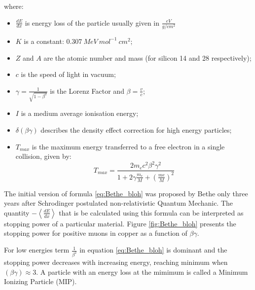 where: 
\begin{itemize}
    \item $\frac{dE}{dx}$ is energy loss of the particle usually given in $\frac{eV}{g/cm^{2}}$
    \item $K$ is a constant: $0.307~ MeV~ mol^{-1}~ cm^2$;
    \item $Z$ and $A$ are the atomic number and mass (for silicon 14 and 28 respectively);
    \item $c$ is the speed of light in vacuum;
    \item $\gamma = \frac{1}{\sqrt{1-\beta^2}}$ is the Lorenz Factor and $\beta = \frac{v}{c}$;
    \item $I$ is a medium average ionisation energy;
    \item $\delta(\beta \gamma)$ describes the density effect correction for high energy particles; 
    \item $T_{max}$ is the maximum energy transferred to a free electron in a single collision, given by:
    \begin{equation}
        T_{max} = \frac{2m_e c^2 \beta^2 \gamma^2}{1+2\gamma \frac{m_e}{M}+ (\frac{me}{M})^2}
    \end{equation}
\end{itemize}

The initial version of formula \ref{eq:Bethe_bloh} was proposed by Bethe \cite{Bethe} only three years after Schrodinger postulated non-relativistic Quantum Mechanic. The quantity $-\left< \frac{dE}{dx} \right>$ that is be calculated using this formula can be interpreted as stopping power of a particular material. Figure \ref{fig:Bethe_bloh} presents the stopping power for positive muons in copper as a function of $\beta \gamma$. 

For low energies term $\frac{1}{\beta^2}$ in equation \ref{eq:Bethe_bloh} is dominant and the stopping power decreases with increasing energy, reaching minimum when $(\beta \gamma) \approx 3 $. A particle with an energy loss at the mimimum is called a Minimum Ionizing Particle (MIP). 



